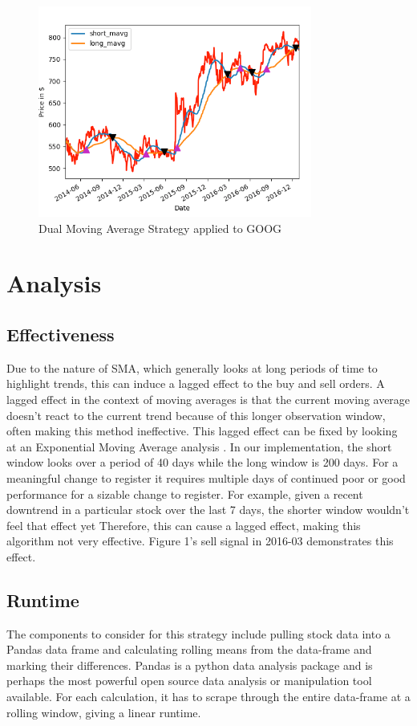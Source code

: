 \documentclass[letterpaper,11pt]{article}
\begin{document}
\begin{figure}[ht!]
\centering
\includegraphics[width=90mm]{SMA_Google.png}
\caption{Dual Moving Average Strategy applied to GOOG \label{overflow}}
\end{figure}

\section*{Analysis}

\subsection*{Effectiveness}
Due to the nature of SMA, which generally looks at long periods of time to highlight trends, this can induce a lagged effect to the buy and sell orders. A lagged effect in the context of moving averages is that the current moving average doesn't react to the current trend because of this longer observation window, often making this method ineffective. This lagged effect can be fixed by looking at an Exponential Moving Average analysis \cite{Ehlers}. In our implementation, the short window looks over a period of 40 days while the long window is 200 days. For a meaningful change to register it requires multiple days of continued poor or good performance for a sizable change to register. For example, given a recent downtrend in a particular stock over the last 7 days, the shorter window wouldn't feel that effect yet Therefore, this can cause a lagged effect, making this algorithm not very effective. Figure 1's sell signal in 2016-03 demonstrates this effect.

\subsection*{Runtime}
The components to consider for this strategy include pulling stock data into a Pandas data frame and calculating rolling means from the data-frame and marking their differences. Pandas is a python data analysis package and is perhaps the most powerful open source data analysis or manipulation tool available. For each calculation, it has to scrape through the entire data-frame at a rolling window, giving a linear runtime.
\end{document}
